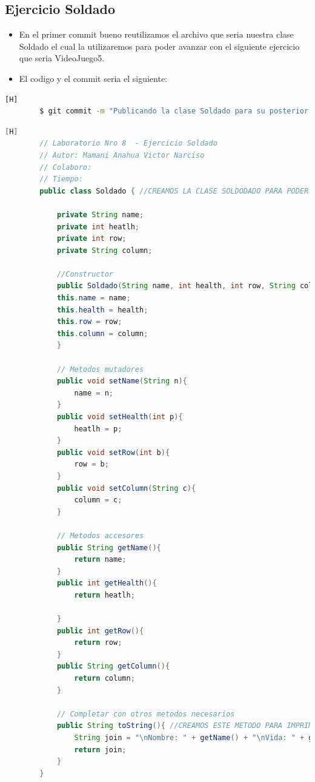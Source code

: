 \documentclass{article}
\begin{document}
	\subsection{Ejercicio Soldado}
	\begin{itemize}	
		\item En el primer commit bueno reutilizamos el archivo que seria nuestra clase Soldado el cual la utilizaremos para poder avanzar con el siguiente ejercicio que seria VideoJuego5.
		\item El codigo y el commit seria el siguiente:
	\end{itemize}	
	\begin{lstlisting}[language=bash,caption={Commit}][H]
		$ git commit -m "Publicando la clase Soldado para su posterior uso en el siguiente ejercicio que es con Hashmaps"
	\end{lstlisting}	
	\begin{lstlisting}[language=java,caption={Las lineas de codigos del metodo creado:}][H]
		// Laboratorio Nro 8  - Ejercicio Soldado
		// Autor: Mamani Anahua Victor Narciso
		// Colaboro:
		// Tiempo:
		public class Soldado { //CREAMOS LA CLASE SOLDODADO PARA PODER USAR UN ARREGLO BIDIMENSIONAL DONDE NECESITAMOS LA VIDA , EL NOMBRE DEL SOLDADO Y TAMBIEN SU POSICION COMO LA FILA Y LA COLUMNA   

			private String name;
			private int heatlh; 
			private int row;
			private String column;

			//Constructor
			public Soldado(String name, int health, int row, String column){
			this.name = name;
			this.health = health;
			this.row = row;
			this.column = column;
			}

			// Metodos mutadores
			public void setName(String n){
				name = n;
			}
			public void setHealth(int p){
				heatlh = p;
			}
			public void setRow(int b){
				row = b;
			}
			public void setColumn(String c){
				column = c; 
			}

			// Metodos accesores
			public String getName(){
				return name;
			}
			public int getHealth(){
				return heatlh;

			}
			public int getRow(){
				return row;
			}
			public String getColumn(){
				return column;
			}

			// Completar con otros metodos necesarios
			public String toString(){ //CREAMOS ESTE METODO PARA IMPRIMIR LOS DATOS DEl OBJETO
				String join = "\nNombre: " + getName() + "\nVida: " + getHealth() + "\nFila: " + getRow() + "\nColumna: " + getColumn(); //Agregamos un espaciador para poder separar
				return join;
			}
		}
	\end{lstlisting}
\end{document}
